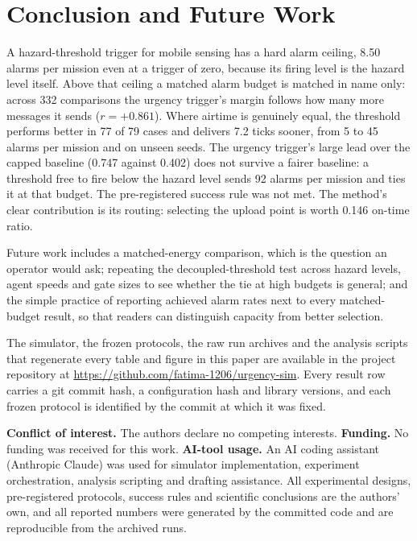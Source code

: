 \documentclass[pdflatex,sn-mathphys-num,iicol]{sn-jnl}
\theoremstyle{thmstyleone}
\theoremstyle{thmstyletwo}
\theoremstyle{thmstylethree}
\begin{document}
\section{Conclusion and Future Work}\label{sec:conclusion}

A hazard-threshold trigger for mobile sensing has a hard alarm ceiling, 8.50 alarms per
mission even at a trigger of zero, because its firing level is the hazard level itself.
Above that ceiling a matched alarm budget is matched in name only: across 332
comparisons the urgency trigger's margin follows how many more messages it sends
($r = +0.861$). Where airtime is genuinely equal, the threshold performs better in 77 of 79 cases
and delivers 7.2 ticks sooner, from 5 to 45 alarms per mission and on unseen seeds. The
urgency trigger's large lead over the capped baseline (0.747 against 0.402) does not
survive a fairer baseline: a threshold free to fire below the hazard level sends 92 alarms
per mission and ties it at that budget. The pre-registered success rule was not met.
The method's clear contribution is its routing: selecting the upload point is worth
0.146 on-time ratio.

Future work includes a matched-energy comparison, which is the question an operator would ask;
repeating the decoupled-threshold test across hazard levels, agent speeds and gate sizes
to see whether the tie at high budgets is general; and the simple practice of reporting
achieved alarm rates next to every matched-budget result, so that readers can distinguish capacity
from better selection.

\backmatter

The simulator, the frozen protocols, the raw run archives and the analysis scripts that
regenerate every table and figure in this paper are available in the project repository at
\url{https://github.com/fatima-1206/urgency-sim}. Every result row carries a git commit hash, a configuration
hash and library versions, and each frozen protocol is identified by the commit at which
it was fixed.

\textbf{Conflict of interest.} The authors declare no competing interests.
\textbf{Funding.} No funding was received for this work.
\textbf{AI-tool usage.} An AI coding assistant (Anthropic Claude) was used for simulator
implementation, experiment orchestration, analysis scripting and drafting assistance.
All experimental designs, pre-registered protocols, success rules and scientific
conclusions are the authors' own, and all reported numbers were generated by the
committed code and are reproducible from the archived runs.


\end{document}
